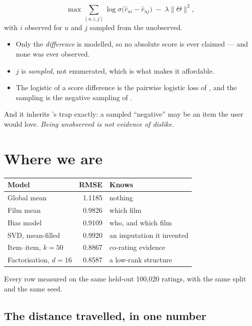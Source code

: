 \documentclass[11pt,a4paper]{article}
\begin{document}
\begin{derivbox}[title={Bayesian personalised ranking}]
\[
  \max \sum_{(u,i,j)} \log \sigma\!\big(\hat r_{ui} - \hat r_{uj}\big)
  \;-\; \lambda\|\Theta\|^2 ,
\]
with $i$ observed for $u$ and $j$ sampled from the unobserved.
\begin{itemize}[leftmargin=*,nosep]
  \item Only the \emph{difference} is modelled, so no absolute score is ever
        claimed --- and none was ever observed.
  \item $j$ is \emph{sampled}, not enumerated, which is what makes it
        affordable.
  \item The logistic of a score difference is the pairwise logistic loss of
        , and the sampling is the negative sampling of .
\end{itemize}
\end{derivbox}

And it inherits 's trap exactly: a sampled ``negative'' may be an
item the user would love. \emph{Being unobserved is not evidence of dislike.}

\section{Where we are}

\begin{center}
\small
\begin{tabular}{lrl}
\toprule
\textbf{Model} & \textbf{RMSE} & \textbf{Knows} \\
\midrule
Global mean              & 1.1185 & nothing \\
Film mean                & 0.9826 & which film \\
Bias model               & 0.9109 & who, and which film \\
SVD, mean-filled         & 0.9920 & an imputation it invented \\
Item--item, $k = 50$     & 0.8867 & co-rating evidence \\
Factorisation, $d = 16$  & 0.8587 & a low-rank structure \\
\bottomrule
\end{tabular}
\end{center}

Every row measured on the same held-out 100{,}020 ratings, with the same split
and the same seed.

\subsection{The distance travelled, in one number}
\end{document}
